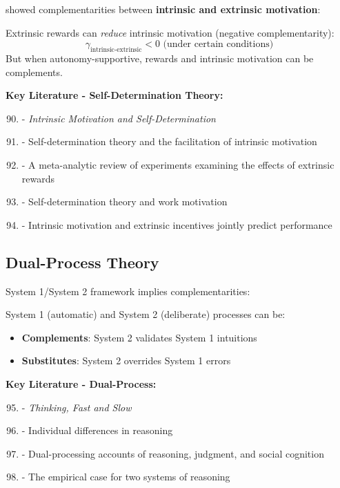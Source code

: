 \citet{deci1985} showed complementarities between \textbf{intrinsic and extrinsic motivation}:

\begin{finding}
Extrinsic rewards can \textit{reduce} intrinsic motivation (negative complementarity):
\begin{equation}
\gamma_{\text{intrinsic-extrinsic}} < 0 \text{ (under certain conditions)}
\end{equation}
But when autonomy-supportive, rewards and intrinsic motivation can be complements.
\end{finding}

\textbf{Key Literature - Self-Determination Theory:}
\begin{enumerate}[noitemsep]
    \setcounter{enumi}{89}
    \item \citet{deci1985} - \textit{Intrinsic Motivation and Self-Determination}
    \item \citet{ryan2000} - Self-determination theory and the facilitation of intrinsic motivation
    \item \citet{deci1999} - A meta-analytic review of experiments examining the effects of extrinsic rewards
    \item \citet{gagné2005} - Self-determination theory and work motivation
    \item \citet{cerasoli2014} - Intrinsic motivation and extrinsic incentives jointly predict performance
\end{enumerate}

\subsection{Dual-Process Theory}
\label{subsec:dual-process}

\citet{kahneman2011} System 1/System 2 framework implies complementarities:

\begin{definition}
System 1 (automatic) and System 2 (deliberate) processes can be:
\begin{itemize}
    \item \textbf{Complements}: System 2 validates System 1 intuitions
    \item \textbf{Substitutes}: System 2 overrides System 1 errors
\end{itemize}
\end{definition}

\textbf{Key Literature - Dual-Process:}
\begin{enumerate}[noitemsep]
    \setcounter{enumi}{94}
    \item \citet{kahneman2011} - \textit{Thinking, Fast and Slow}
    \item \citet{stanovich2000} - Individual differences in reasoning
    \item \citet{evans2008} - Dual-processing accounts of reasoning, judgment, and social cognition
    \item \citet{sloman1996} - The empirical case for two systems of reasoning
\end{enumerate}

